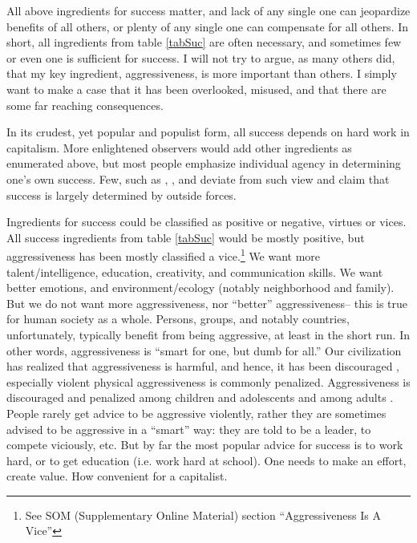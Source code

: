 \documentclass[11pt, letterpaper]{article}
\begin{document}
\begin{spacing}{2.0}
All above ingredients for success matter, and lack of any single one
can jeopardize benefits of all others, or plenty of any single one can
compensate for all others. In short, all ingredients from table \ref{tabSuc} are often necessary, and
sometimes few or even one is sufficient for success. I will not try to argue, as many
others did, that my key ingredient, aggressiveness, is more important than
others. I simply want to make a case that it has been overlooked, misused,  and that there are some far reaching consequences.

In its crudest, yet popular and populist form, all success depends on
hard work in capitalism. More
enlightened observers would add other ingredients as enumerated above, but most people emphasize individual agency in determining one's own
success. Few, such as \citet{fischer96}, \citet{mills99}, and \citet{frank12} deviate from such view and claim that
success is largely determined by outside forces. %

Ingredients for success could be classified as positive or negative,
  virtues or vices.
 All success ingredients from table \ref{tabSuc} would be mostly positive, but
 aggressiveness has been mostly classified  a vice.\footnote{See SOM (Supplementary Online Material) section ``Aggressiveness Is A Vice''}
  We want more talent/intelligence, education, creativity, and
communication skills.  We want  better emotions, and  environment/ecology
(notably neighborhood and family). But we do not want more aggressiveness, nor %
``better'' aggressiveness--%
%
this is true for human  society as a whole. Persons, groups, and notably countries, unfortunately, typically
benefit from being aggressive, at least in the short run. In other words,
aggressiveness is ``smart for one, but dumb for all.'' Our civilization has realized that aggressiveness is
harmful, and hence, it has been discouraged \citep{freud30}, especially violent
physical 
aggressiveness is commonly penalized. Aggressiveness is discouraged and
penalized  among children and adolescents \citep{little13} and  among
adults \citep[e.g.,][]{dahling2014machiavellianism}.
People rarely get advice to be aggressive
violently, rather they are sometimes advised to be aggressive in a ``smart'' way:
 they are told to be a leader, to compete viciously, etc. But by far the most popular
advice for success is to work hard, or to get education (i.e. work hard at school). One needs to make an effort, create value. How
convenient for a capitalist.



\end{spacing}
\end{document}
